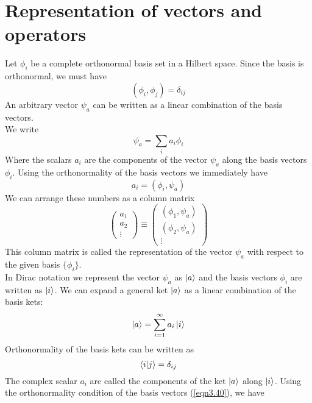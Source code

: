 \section{Representation of vectors and operators}
Let ${\phi_i}$ be a complete orthonormal basis set in a Hilbert space. Since the basis is orthonormal, we must have
\begin{equation}\label{eqn3.36}
(\phi_i,\phi_j) = \delta_{ij}
\end{equation}
An arbitrary vector $\psi_a$ can be written as a linear combination of the basis vectors.\\
We write
\begin{equation}\label{eqn3.37}
\psi_a = \sum_{i} a_i\phi_i
\end{equation}
Where the scalars $a_i$ are the components of the vector $\psi_a$ along the basis vectors $\phi_i$. Using the orthonormality of the basis vectors we immediately have
\begin{equation}\label{eqn3.38}
a_i = (\phi_i, \psi_a)
\end{equation}
We can arrange these numbers as a column matrix
\begin{equation}\label{eqn3.39}
\left(
\begin{matrix}
a_1 \\ a_2 \\ \vdots
\end{matrix}
\right) \equiv \left(
\begin{matrix}
(\phi_1, \psi_a) \\
(\phi_2, \psi_a) \\
\vdots
\end{matrix}
\right)
\end{equation}
This column matrix is called the representation of the vector $\psi_a$ with respect to the given basis $\{\phi_i \}$.\\
In Dirac notation we represent the vector $\psi_a$ as $\ket{a}$ and the basis vectors $\phi_i$ are written as $\ket{i}$. We can expand a general ket $\ket{a}$ as a linear combination of the basis kets:
\begin{equation}\label{eqn3.40}
\ket{a} = \sum_{i=1}^{\infty} a_i \ket{i}
\end{equation}
Orthonormality of the basis kets can be written as
\begin{equation}
\label{eqn3.41}
\braket{i}{j} = \delta_{ij}
\end{equation}
The complex scalar $a_i$ are called the components of the ket $\ket{a}$ along $\ket{i}$. Using the orthonormality condition of the basis vectors (\ref{eqn3.40}), we have 

